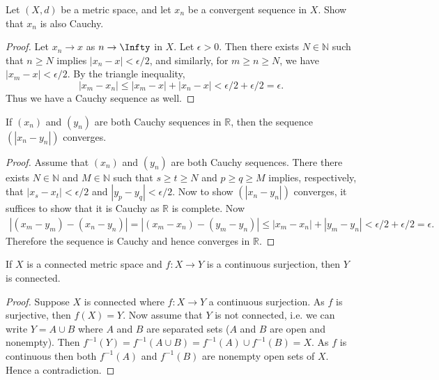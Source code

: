 \documentclass[oneside]{amsart}
\theoremstyle{definition}
\newcommand{\rr}{\mathbb R}
\newcommand{\nn}{\mathbb N}
\begin{document}
\begin{tcolorbox}[colback=black!5!white,colframe=black!75!black,title= Exercise $3.1.$] Let $(X,d)$ be a metric space, and let $x_n$ be a convergent sequence in $X$. Show that $x_n$ is also Cauchy.
\tcblower 
\begin{proof} Let $x_n \to x$ as $n \to \Infty$ in $X$. Let $\epsilon > 0$. Then there exists $N \in \nn$ such that $n \geq N$ implies $|x_n -x | < \epsilon/2$, and similarly, for $m \geq n \geq N$, we have $|x_m - x| < \epsilon/2$. By the triangle inequality, 
\[
|x_m - x_n | \leq |x_m -x|+|x_n -x| < \epsilon/2 + \epsilon/2 = \epsilon.
\] Thus we have a Cauchy sequence as well. 
\end{proof}
\end{tcolorbox}


\begin{tcolorbox}[colback=black!5!white,colframe=black!75!black,title= Exercise $3.2.$]If $(x_n)$ and $(y_n)$ are both Cauchy sequences in $\rr$, then the sequence $(|x_n -y_n|)$ converges.
\tcblower 
\begin{proof} Assume that $(x_n)$ and $(y_n)$ are both Cauchy sequences. There there exists $N \in \nn$ and $M \in \nn$ such that $s \geq t \geq N$ and $p \geq q \geq M$ implies, respectively, that $|x_s - x_t| < \epsilon/2$ and $|y_p - y_q| < \epsilon/2$. Now to show $(|x_n-y_n|)$ converges, it suffices to show that it is Cauchy as $\rr$ is complete. Now 
\begin{align*}
	|(x_m -y_m) - (x_n - y_n)| = | (x_m -x_n )-(y_m-y_n)|\leq |x_m -x_n| + |y_m - y_n| < \epsilon/2 +\epsilon/2 = \epsilon.
\end{align*} Therefore the sequence is Cauchy and hence converges in $\rr$.
\end{proof}
\end{tcolorbox}
\begin{tcolorbox}[colback=black!5!white,colframe=black!75!black,title= Exercise $3.3.$] If $X$ is a connected metric space and $f \colon X \to Y$ is a continuous surjection, then $Y$ is connected.
\tcblower 
\begin{proof} Suppose $X$ is connected where $f \colon X\to Y$ a continuous surjection. As $f$ is surjective, then $f(X) = Y$. Now assume that $Y$ is not connected, i.e. we can write $Y = A \cup B$ where $A$ and $B$ are separated sets ($A$ and $B$ are open and nonempty). Then $f^{-1}(Y) = f^{-1} (A \cup B) = f^{-1} (A) \cup f^{-1} (B) = X$. As $f$ is continuous then both $f^{-1} (A)$ and $f^{-1}(B)$ are nonempty open sets of $X$. Hence a contradiction. 
\end{proof} 
\end{tcolorbox}
\end{document}
